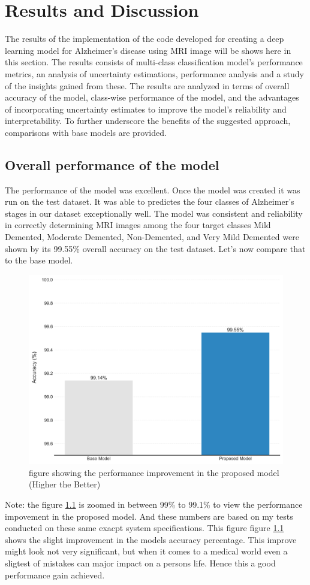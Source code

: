 \documentclass[12pt,onecolumn]{report}
\begin{document}
\chapter{Results and Discussion}
The results of the implementation of the code developed for creating a deep learning model for Alzheimer's disease using MRI image will be shows here in this section. The results consists of multi-class classification model’s performance metrics, an analysis of uncertainty estimations, performance analysis and a study of the insights gained from these. The results are analyzed in terms of overall accuracy of the model, class-wise performance of the model, and the advantages of incorporating uncertainty estimates to improve the model’s reliability and interpretability. To further underscore the benefits of the suggested approach, comparisons with base models are provided.

\section{Overall performance of the model}
The performance of the model was excellent. Once the model was created it was  run on the test dataset. It was able to predictes the four classes of Alzheimer's stages in our dataset exceptionally well. The model was consistent and reliability in correctly determining MRI images among the four target classes Mild Demented, Moderate Demented, Non-Demented, and Very Mild Demented were shown by its 99.55\% overall accuracy on the test dataset. Let's now compare that to the base model.
\begin{figure}[H]
    \centering
    \includegraphics[width=0.6\columnwidth]{figures/res_model_comparison.png}  %
    \caption{figure showing the performance improvement in the proposed model (Higher the Better)} %
    \label{fig:res_model_comparison} %
\end{figure}
Note: the figure \ref{fig:res_model_comparison} is zoomed in between 99\% to 99.1\% to view the performance impovement in the proposed model. And these numbers are based on my tests conducted on these same exacpt system specifications.
This figure figure \ref{fig:res_model_comparison} shows the slight improvement in the models accuracy percentage. This improve might look not very significant, but when it comes to a medical world even a sligtest of mistakes can major impact on a persons life. Hence this a good performance gain achieved.
\end{document}
